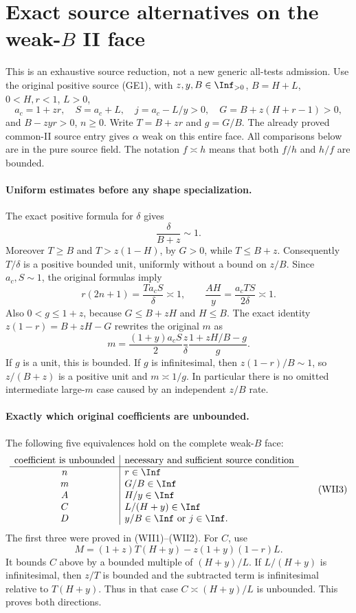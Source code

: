 \section{Exact source alternatives on the weak-\texorpdfstring{$B$}{B} II face}
\label{sec:r8-weak-ii-source}
This is an exhaustive source reduction, not a new generic all-tests
admission. Use the original positive source (GE1), with
$z,y,B\in\Inf_{>0}$, $B=H+L$, $0<H,r<1$, $L>0$,
\[
 a_c=1+zr,\quad S=a_c+L,\quad j=a_c-L/y>0,
 \quad G=B+z(H+r-1)>0,
\]
and $B-zyr>0$, $n\geq0$. Write $T=B+zr$ and $g=G/B$.
The already proved common-II source entry gives $\alpha$ weak on
this entire face. All comparisons below are in the pure source field.
The notation $f\asymp h$ means that both $f/h$ and $h/f$ are bounded.

\paragraph{Uniform estimates before any shape specialization.}
The exact positive formula for $\delta$ gives
\[
 \frac\delta{B+z}\sim1.
\]
Moreover $T\geq B$ and $T>z(1-H)$, by $G>0$, while $T\leq B+z$.
Consequently $T/\delta$ is a positive bounded unit, uniformly without
a bound on $z/B$. Since $a_c,S\sim1$, the original formulas imply
\[
 r(2n+1)=\frac{Ta_cS}{\delta}\asymp1,
 \qquad \frac{AH}{y}=\frac{a_cTS}{2\delta}\asymp1.
                                                               \tag{WII1}
\]
Also $0<g\leq1+z$, because $G\leq B+zH$ and $H\leq B$.
The exact identity $z(1-r)=B+zH-G$ rewrites the original $m$ as
\[
 m=\frac{(1+y)a_cS}{2}\frac z\delta
       \frac{1+zH/B-g}{g}.                       \tag{WII2}
\]
If $g$ is a unit, this is bounded. If $g$ is infinitesimal, then
$z(1-r)/B\sim1$, so $z/(B+z)$ is a positive unit and
$m\asymp1/g$. In particular there is no omitted intermediate
large-$m$ case caused by an independent $z/B$ rate.

\paragraph{Exactly which original coefficients are unbounded.}
The following five equivalences hold on the complete weak-$B$ face:
\[
\begin{array}{c|l}
\text{coefficient is unbounded}&\text{necessary and sufficient source condition}\\ \hline
n&r\in\Inf\\
m&G/B\in\Inf\\
A&H/y\in\Inf\\
C&L/(H+y)\in\Inf\\
D&y/B\in\Inf\ \text{or}\ j\in\Inf.
\end{array}                                                     \tag{WII3}
\]
The first three were proved in (WII1)--(WII2). For $C$, use
\[
 M=(1+z)T(H+y)-z(1+y)(1-r)L.
\]
It bounds $C$ above by a bounded multiple of $(H+y)/L$. If
$L/(H+y)$ is infinitesimal, then $z/T$ is bounded and the subtracted
term is infinitesimal relative to $T(H+y)$. Thus in that case
$C\asymp(H+y)/L$ is unbounded. This proves both directions.

